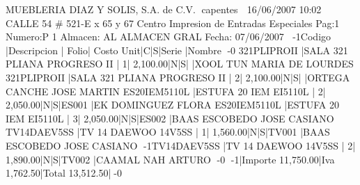                       MUEBLERIA DIAZ Y SOLIS, S.A. de C.V.                      
capentes           16/06/2007 10:02 CALLE 54 # 521-E x 65 y 67 Centro          
                     Impresion de Entradas Especiales Pag:1                     
Numero:P     1 Almacen: AL ALMACEN GRAL Fecha: 07/06/2007
-1Codigo       |Descripcion                   | Folio|  Costo Unit|C|S|Serie               |Nombre                        -0
321PLIPROII  |SALA 321 PLIANA PROGRESO II   |     1|    2,100.00|N|S|                    |XOOL TUN MARIA DE LOURDES     
321PLIPROII  |SALA 321 PLIANA PROGRESO II   |     2|    2,100.00|N|S|                    |ORTEGA CANCHE JOSE MARTIN     
ES20IEM5110L |ESTUFA 20 IEM EI5110L         |     2|    2,050.00|N|S|ES001               |EK DOMINGUEZ FLORA            
ES20IEM5110L |ESTUFA 20 IEM EI5110L         |     3|    2,050.00|N|S|ES002               |BAAS ESCOBEDO JOSE CASIANO    
TV14DAEV5SS  |TV 14 DAEWOO 14V5SS           |     1|    1,560.00|N|S|TV001               |BAAS ESCOBEDO JOSE CASIANO    
-1TV14DAEV5SS  |TV 14 DAEWOO 14V5SS           |     2|    1,890.00|N|S|TV002               |CAAMAL NAH ARTURO             -0
    -1|Importe   11,750.00|Iva        1,762.50|Total     13,512.50|-0

